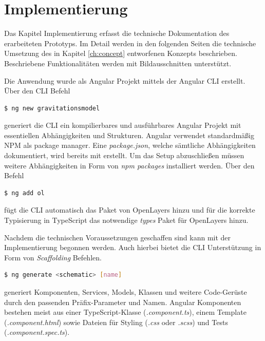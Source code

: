 \chapter{Implementierung}
\label{ch:implementierung}
Das Kapitel Implementierung erfasst die technische Dokumentation des erarbeiteten Prototyps.
Im Detail werden in den folgenden Seiten die technische Umsetzung des in Kapitel \ref{ch:concept} entworfenen Konzepts beschrieben. 
Beschriebene Funktionalitäten werden mit Bildausschnitten unterstützt.

Die Anwendung wurde als Angular Projekt mittels der Angular CLI erstellt. 
Über den CLI Befehl 

\begin{lstlisting}[language=bash, caption={Erstellen eines neuen Projektes}]
$ ng new gravitationsmodel
\end{lstlisting}

generiert die CLI ein kompilierbares und ausführbares Angular Projekt mit essentiellen Abhängigkeiten und Strukturen.
Angular verwendet standardmäßig NPM als package manager.
Eine \emph{package.json}, welche sämtliche Abhängigkeiten dokumentiert, wird bereits mit erstellt.
Um das Setup abzuschließen müssen weitere Abhängigkeiten in Form von \emph{npm packages} installiert werden.
Über den Befehl 

\begin{lstlisting}[language=bash, caption={Hinzufügen des OpenLayers Pakets}]
$ ng add ol
\end{lstlisting}

fügt die CLI automatisch das Paket von OpenLayers hinzu und für die korrekte Typisierung in TypeScript das notwendige \emph{types} Paket für OpenLayers hinzu.

Nachdem die technischen Voraussetzungen geschaffen sind kann mit der Implementierung begonnen werden.
Auch hierbei bietet die CLI Unterstützung in Form von \emph{Scaffolding} Befehlen.

\begin{lstlisting}[language=bash, caption={Angular schematic Befehl zum Erstellen}]
$ ng generate <schematic> [name]
\end{lstlisting}

generiert Komponenten, Services, Models, Klassen und weitere Code-Gerüste durch den passenden Präfix-Parameter und Namen.
Angular Komponenten bestehen meist aus einer TypeScript-Klasse (\emph{.component.ts}), einem Template (\emph{.component.html}) sowie Dateien für Styling (\emph{.css} oder \emph{.scss}) und Tests (\emph{.component.spec.ts}).

